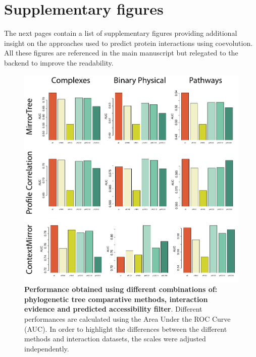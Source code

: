 \chapter{Supplementary figures}
\label{supplementaryfigures}

The next pages contain a list of supplementary figures providing additional insight on the approaches used to predict protein interactions using coevolution. All these figures are referenced in the main manuscript but relegated to the backend to improve the readability.


\begin{figure}[htbp]
\centering
\includegraphics[keepaspectratio,width=\textwidth,height=0.75\textheight]{../figures/accsROCs_differentScales.pdf}
\caption{\textbf{Performance obtained using different combinations of: phylogenetic tree comparative methods, interaction evidence and predicted accessibility filter}. Different performances are calculated using the Area Under the ROC Curve (AUC). In order to highlight the differences between the different methods and interaction datasets, the scales were adjusted independently.}
\label{accsrocs_differentscales.pdf}
\end{figure}

